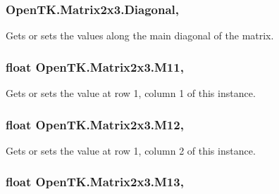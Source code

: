 \hypertarget{struct_open_t_k_1_1_matrix2x3_a524f01afde7283253e5c9f62ddf4a766}{
\subsubsection[{Diagonal}]{ Open\-T\-K.\-Matrix2x3.\-Diagonal\hspace{0.3cm}{\ttfamily [get]}, {\ttfamily [set]}}}\label{struct_open_t_k_1_1_matrix2x3_a524f01afde7283253e5c9f62ddf4a766}


Gets or sets the values along the main diagonal of the matrix. 

\hypertarget{struct_open_t_k_1_1_matrix2x3_a7686efba47f2746663c5c285b604ee2a}{
\subsubsection[{M11}]{\setlength{\rightskip}{0pt plus 5cm}float Open\-T\-K.\-Matrix2x3.\-M11\hspace{0.3cm}{\ttfamily [get]}, {\ttfamily [set]}}}\label{struct_open_t_k_1_1_matrix2x3_a7686efba47f2746663c5c285b604ee2a}


Gets or sets the value at row 1, column 1 of this instance. 

\hypertarget{struct_open_t_k_1_1_matrix2x3_a9ae398c4140799edc383c67b6e0144be}{
\subsubsection[{M12}]{\setlength{\rightskip}{0pt plus 5cm}float Open\-T\-K.\-Matrix2x3.\-M12\hspace{0.3cm}{\ttfamily [get]}, {\ttfamily [set]}}}\label{struct_open_t_k_1_1_matrix2x3_a9ae398c4140799edc383c67b6e0144be}


Gets or sets the value at row 1, column 2 of this instance. 

\hypertarget{struct_open_t_k_1_1_matrix2x3_a113cdc83f86a738e3f0cba0414cfbb9f}{
\subsubsection[{M13}]{\setlength{\rightskip}{0pt plus 5cm}float Open\-T\-K.\-Matrix2x3.\-M13\hspace{0.3cm}{\ttfamily [get]}, {\ttfamily [set]}}}\label{struct_open_t_k_1_1_matrix2x3_a113cdc83f86a738e3f0cba0414cfbb9f}


